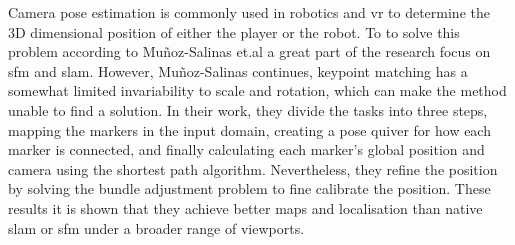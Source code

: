 Camera pose estimation is commonly used in robotics and \ac{vr} to determine the 3D dimensional position of either the player or the robot.
To to solve this problem according to Mu{\~n}oz-Salinas et.al\cite{munoz2018mapping} a great part of the research focus on \ac{sfm} and \ac{slam}.
However, Mu{\~n}oz-Salinas continues, keypoint matching has a somewhat limited invariability to scale and rotation, which can make the method unable to find a solution.
In their work, they divide the tasks into three steps, mapping the markers in the input domain, creating a pose quiver for how each marker is connected, and finally calculating each marker's global position and camera using the shortest path algorithm.
Nevertheless, they refine the position by solving the bundle adjustment problem to fine calibrate the position.
These results it is shown that they achieve better maps and localisation than native \ac{slam} or \ac{sfm} under a broader range of viewports.



